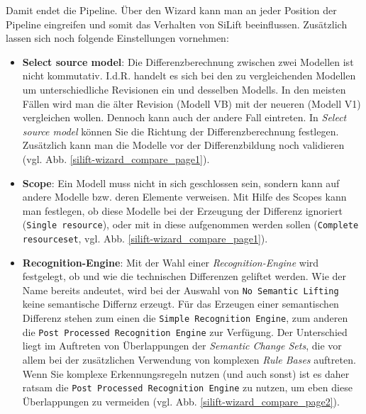 \documentclass[a4paper]{scrartcl}
\begin{document}
Damit endet die Pipeline.
Über den Wizard kann man an jeder Position der Pipeline eingreifen und somit das Verhalten von SiLift beeinflussen. Zusätzlich lassen sich noch folgende Einstellungen vornehmen:
\begin{itemize}

\item \textbf{Select source model}: Die Differenzberechnung zwischen zwei Modellen ist nicht kommutativ.
I.d.R. handelt es sich bei den zu vergleichenden Modellen um unterschiedliche Revisionen ein und desselben Modells.
In den meisten Fällen wird man die älter Revision (Modell VB) mit der neueren (Modell V1) vergleichen wollen.
Dennoch kann auch der andere Fall eintreten.
In \textit{Select source model} können Sie die Richtung der Differenzberechnung festlegen.\\
Zusätzlich kann man die Modelle vor der Differenzbildung noch validieren (vgl. Abb. \ref{silift-wizard_compare_page1}).


\item \textbf{Scope}: Ein Modell muss nicht in sich geschlossen sein, sondern kann auf andere Modelle bzw. deren Elemente verweisen.
Mit Hilfe des Scopes kann man festlegen, ob diese Modelle bei der Erzeugung der Differenz ignoriert (\texttt{Single resource}), oder mit in diese aufgenommen werden sollen (\texttt{Complete resourceset}, vgl. Abb. \ref{silift-wizard_compare_page1}).


\item \textbf{Recognition-Engine}: Mit der Wahl einer \textit{Recognition-Engine} wird festgelegt, ob und wie die technischen Differenzen geliftet werden.
Wie der Name bereits andeutet, wird bei der Auswahl von \texttt{No Semantic Lifting} keine semantische Differnz erzeugt.
Für das Erzeugen einer semantischen Differenz stehen zum einen die \texttt{Simple Recognition Engine}, zum anderen die \texttt{Post Processed Recognition Engine} zur Verfügung.
Der Unterschied liegt im Auftreten von Überlappungen der \textit{Semantic Change Sets}, die vor allem bei der zusätzlichen Verwendung von komplexen \textit{Rule Bases} auftreten.
Wenn Sie komplexe Erkennungsregeln nutzen (und auch sonst) ist es daher ratsam die \texttt{Post Processed Recognition Engine} zu nutzen, um eben diese Überlappungen zu vermeiden (vgl. Abb. \ref{silift-wizard_compare_page2}).

\end{itemize}
\end{document}
